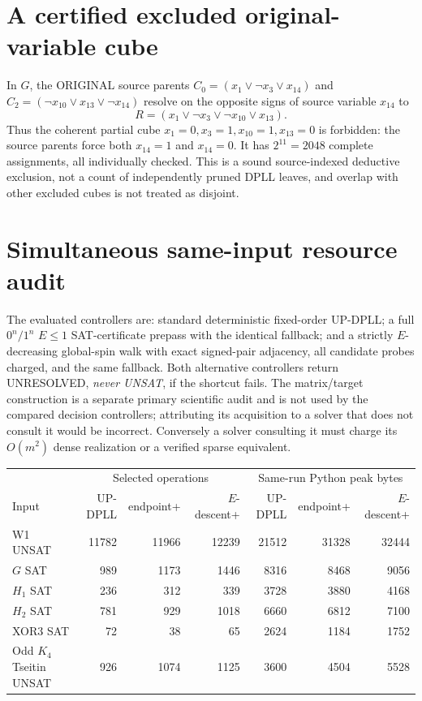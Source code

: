 \documentclass[10pt]{article}
\begin{document}
\section{A certified excluded original-variable cube}
In $G$, the ORIGINAL source parents $C_0=(x_1\vee\neg x_3\vee x_{14})$ and $C_2=(\neg x_{10}\vee x_{13}\vee\neg x_{14})$ resolve on the opposite signs of source variable $x_{14}$ to
\[
 R=(x_1\vee\neg x_3\vee\neg x_{10}\vee x_{13}).
\]
Thus the coherent partial cube $x_1=0,x_3=1,x_{10}=1,x_{13}=0$ is forbidden: the source parents force both $x_{14}=1$ and $x_{14}=0$. It has $2^{11}=2048$ complete assignments, all individually checked. This is a sound source-indexed deductive exclusion, not a count of independently pruned DPLL leaves, and overlap with other excluded cubes is not treated as disjoint.
\section{Simultaneous same-input resource audit}
The evaluated controllers are: standard deterministic fixed-order UP-DPLL; a full $0^n/1^n$ $E\le1$ SAT-certificate prepass with the identical fallback; and a strictly $E$-decreasing global-spin walk with exact signed-pair adjacency, all candidate probes charged, and the same fallback. Both alternative controllers return UNRESOLVED, \emph{never UNSAT}, if the shortcut fails. The matrix/target construction is a separate primary scientific audit and is not used by the compared decision controllers; attributing its acquisition to a solver that does not consult it would be incorrect. Conversely a solver consulting it must charge its $O(m^2)$ dense realization or a verified sparse equivalent.
\begin{center}\small
\begin{tabular}{lrrrrrr}\toprule
& \multicolumn{3}{c}{Selected operations} & \multicolumn{3}{c}{Same-run Python peak bytes}\\
Input & UP-DPLL & endpoint+ & $E$-descent+ & UP-DPLL & endpoint+ & $E$-descent+\\\midrule
W1 UNSAT & 11782 & 11966 & 12239 & 21512 & 31328 & 32444\\
$G$ SAT & 989 & 1173 & 1446 & 8316 & 8468 & 9056\\
$H_1$ SAT & 236 & 312 & 339 & 3728 & 3880 & 4168\\
$H_2$ SAT & 781 & 929 & 1018 & 6660 & 6812 & 7100\\
XOR3 SAT & 72 & 38 & 65 & 2624 & 1184 & 1752\\
Odd $K_4$ Tseitin UNSAT & 926 & 1074 & 1125 & 3600 & 4504 & 5528\\\bottomrule
\end{tabular}
\end{center}
\end{document}

